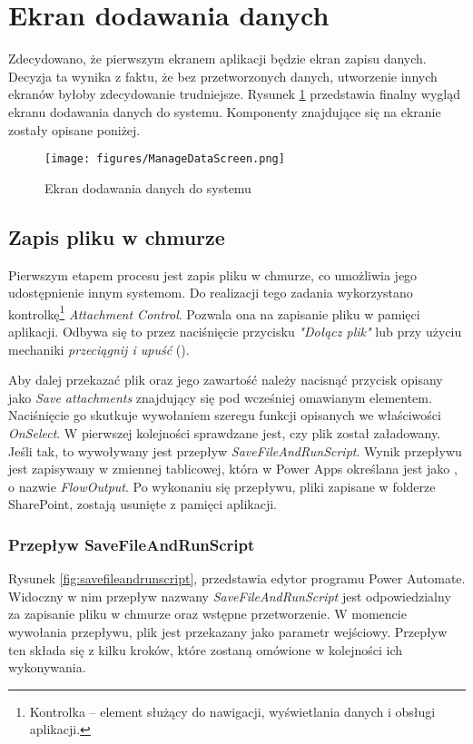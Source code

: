 \section{Ekran dodawania danych}

Zdecydowano, że pierwszym ekranem aplikacji będzie ekran zapisu danych. Decyzja ta wynika z faktu, że bez przetworzonych danych, utworzenie innych ekranów byłoby zdecydowanie trudniejsze. Rysunek \ref{fig:managedatascreen} przedstawia finalny wygląd ekranu dodawania danych do systemu. Komponenty znajdujące się na ekranie zostały opisane poniżej.
\begin{figure}[H]
    \centering
    \texttt{[image: figures/ManageDataScreen.png]}
    \caption{Ekran dodawania danych do systemu} 
    \label{fig:managedatascreen}
\end{figure}

\subsection{Zapis pliku w chmurze}
Pierwszym etapem procesu jest zapis pliku w chmurze, co umożliwia jego udostępnienie innym systemom. Do realizacji tego zadania wykorzystano kontrolkę\footnote{Kontrolka -- element służący do nawigacji, wyświetlania danych i obsługi aplikacji.} \emph{Attachment Control}. Pozwala ona na zapisanie pliku w pamięci aplikacji. Odbywa się to przez naciśnięcie przycisku \emph{"Dołącz plik"} lub przy użyciu mechaniki \emph{przeciągnij i upuść} (). 

Aby dalej przekazać plik oraz jego zawartość należy nacisnąć przycisk opisany jako \emph{Save attachments} znajdujący się pod wcześniej omawianym elementem. Naciśnięcie go skutkuje wywołaniem szeregu funkcji opisanych we właściwości \emph{OnSelect}. W pierwszej kolejności sprawdzane jest, czy plik został załadowany. Jeśli tak, to wywoływany jest przepływ \emph{SaveFileAndRunScript}. Wynik przepływu jest zapisywany w zmiennej tablicowej, która w Power Apps określana jest jako , o nazwie \emph{FlowOutput}. Po wykonaniu się przepływu, pliki zapisane w folderze SharePoint, zostają usunięte z pamięci aplikacji.



\subsubsection{Przepływ SaveFileAndRunScript}
Rysunek \ref{fig:savefileandrunscript}, przedstawia edytor programu Power Automate. Widoczny w nim przepływ nazwany \emph{SaveFileAndRunScript} jest odpowiedzialny za zapisanie pliku w chmurze oraz wstępne przetworzenie. W momencie wywołania przepływu, plik jest przekazany jako parametr wejściowy. Przepływ ten składa się z kilku kroków, które zostaną omówione w kolejności ich wykonywania.

